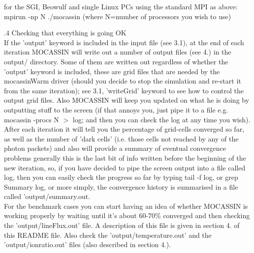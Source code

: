 \documentclass[11pt]{article}
\begin{document}
\noindent        for the SGI, Beowulf and single Linux PCs using the standard MPI as above:\\
\indent         mpirun -np N ./mocassin (where N=number of processors you wish to use)\indent 

.4 Checking that everything is going OK\\
        If the 'output' keyword is included in the input file (see 3.1), 
        at the end of each iteration MOCASSIN will write out a number of output files 
        (see 4.) in the output/ directory. 
        Some of them are written out regardless of whether the 'output'
        keyword is included, these are grid files that are needed by the mocassinWarm 
        driver (should you decide to stop the simulation and re-start it from the same 
        iteration); see 3.1, 'writeGrid' keyword to see how to control the output grid files. 
        Also MOCASSIN will keep you updated on what he is doing by 
        outputting stuff to the screen (if that annoys you, just pipe it to a file 
        e.g. mocassin -procs N $>$ log; and then you can check the log at any time 
        you wish). \\
        After each iteration it will tell you the percentage of grid-cells 
        converged so far, as well as the number of 'dark cells' (i.e. those cells not reached
        by any of the photon packets) and also will provide a summary of eventual 
        convergence problems generally this is the last bit of info written before the 
        beginning of the new iteration, so, if you have decided to pipe the screen output
        into a file called log, then you can easily check the progress so far by 
        typing tail -f log, or grep Summary log, or more simply, the convergence history is 
	summarised in a file called 'output/summary.out.  \\
        For the benchmark cases you can start having an idea of whether MOCASSIN is working 
        properly by waiting until it's about 60-70\% converged and 
        then checking the 'output/lineFlux.out' file. A description of this file is 
        given in section 4. of this README file. Also check the 'output/temperature.out' and
        the 'output/ionratio.out' files (also described in section 4.).\\
\end{document}
